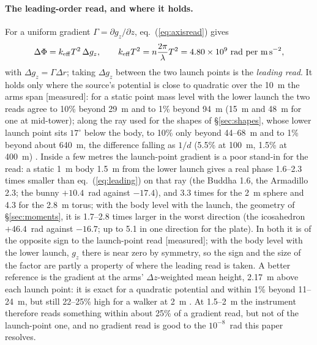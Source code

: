 \documentclass[10pt,a4paper]{article}
\newcommand{\tagM}{\textsf{\small[measured]}}
\begin{document}
\paragraph{The leading-order read, and where it holds.} For a uniform gradient
$\Gamma = \partial g_z/\partial z$, eq.~(\ref{eq:axisread}) gives
\begin{equation}
\Delta\Phi = k_\mathrm{eff}T^2\,\Delta g_z,\qquad k_\mathrm{eff}T^2 = n\frac{2\pi}{\lambda}T^2 =
4.80\times10^{9}~\text{rad per m\,s}^{-2},
\label{eq:leading}
\end{equation}
with $\Delta g_z = \Gamma\Delta r$; taking $\Delta g_z$ between the two launch points is the
\emph{leading read}. It holds only where the source's potential is close to quadratic over
the 10~m the arms span \tagM: for a static point mass level with the lower launch the two reads agree
to 10\% beyond 29~m and to 1\% beyond 94~m (15~m and 48~m for one at mid-tower); along the ray used for
the shapes of \S\ref{sec:shapes}, whose lower launch point sits $17^\circ$ below the body, to 10\% only
beyond 44--68~m and to 1\% beyond about 640~m, the difference falling as $1/d$ (5.5\% at 100~m, 1.5\%
at 400~m) \citep[\S4]{paperrealread}. Inside a few metres the launch-point gradient is a poor
stand-in for the read: a static 1~m body 1.5~m from the lower launch gives a real phase 1.6--2.3
times smaller than eq.~(\ref{eq:leading}) on that ray (the Buddha 1.6, the Armadillo 2.3; the bunny
$+10.4$~rad against $-17.4$), and 3.3 times for the 2~m sphere and 4.3 for the 2.8~m torus; with the
body level with the launch, the geometry of \S\ref{sec:moments}, it is 1.7--2.8 times larger in the
worst direction (the icosahedron $+46.4$~rad against $-16.7$; up to 5.1 in one direction for the
plate). In both it is of the opposite sign to the launch-point read \tagM; with the body level with
the lower launch, $g_z$ there is near zero by symmetry, so the sign and the size of the factor are
partly a property of where the leading read is taken. A better reference is the gradient at the
arms' $\Delta z$-weighted mean height, 2.17~m above each launch point: it is exact for a quadratic
potential and within 1\% beyond 11--24~m, but still 22--25\% high for a walker at 2~m
\citep[\S3.1]{paperflight}. At 1.5--2~m the instrument therefore reads something within about 25\%
of a gradient read, but not of the launch-point one, and no gradient read is good to the
$10^{-8}$~rad this paper resolves.
\end{document}
